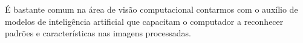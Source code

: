 É bastante comum na área de visão computacional contarmos com o auxílio de modelos de inteligência artificial que capacitam o computador a reconhecer padrões e características nas imagens processadas.